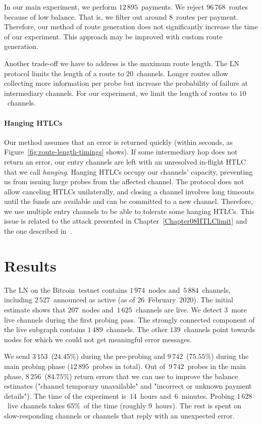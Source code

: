 In our main experiment, we perform $12\,895$~payments.
We reject $96\,768$~routes because of low balance.
That is, we filter out around $8$~routes per payment.
Therefore, our method of route generation does not significantly increase the time of our experiment.
This approach may be improved with custom route generation.

Another trade-off we have to address is the maximum route length.
The LN protocol limits the length of a route to $20$~channels.
Longer routes allow collecting more information per probe but increase the probability of failure at intermediary channels.
For our experiment, we limit the length of routes to $10$~channels.

\paragraph{Hanging HTLCs}
Our method assumes that an error is returned quickly (within seconds, as Figure~\ref{fig:route-length-timings} shows).
If some intermediary hop does not return an error, our entry channels are left with an unresolved in-flight HTLC that we call \textit{hanging}.
Hanging HTLCs occupy our channels' capacity, preventing us from issuing large probes from the affected channel.
The protocol does not allow canceling HTLCs unilaterally, and closing a channel involves long timeouts until the funds are available and can be committed to a new channel.
Therefore, we use multiple entry channels to be able to tolerate some hanging HTLCs.
This issue is related to the attack presented in Chapter~\ref{Chapter08HTLClimit} and the one described in~\cite{Mizrahi2020}.

\section{Results} \label{sec:results}

The LN on the Bitcoin~testnet contains $1\,974$~nodes and~$5\,884$~channels, including $2\,527$~announced as active (as of 26~February~2020).
The initial estimate shows that $207$~nodes and~$1\,625$~channels are live.
We detect $3$~more live channels during the first probing pass.
The strongly connected component of the live subgraph contains $1\,489$~channels.
The other $139$~channels point towards nodes for which we could not get meaningful error messages.

We send $3\,153$~($24.45\%$) during the pre-probing and $9\,742$~($75.55\%$) during the main probing phase ($12\,895$~probes in total).
Out of~$9\,742$~probes in the main phase, $8\,256$~($84.75\%$) return errors that we can use to improve the balance estimates ("channel temporary unavailable" and "incorrect or unknown payment details").
The time of the experiment is~$14$~hours and~$6$~minutes.
Probing $1\,628$~live channels takes $65\%$~of the time (roughly $9$~hours).
The rest is spent on slow-responding channels or channels that reply with an unexpected error.


